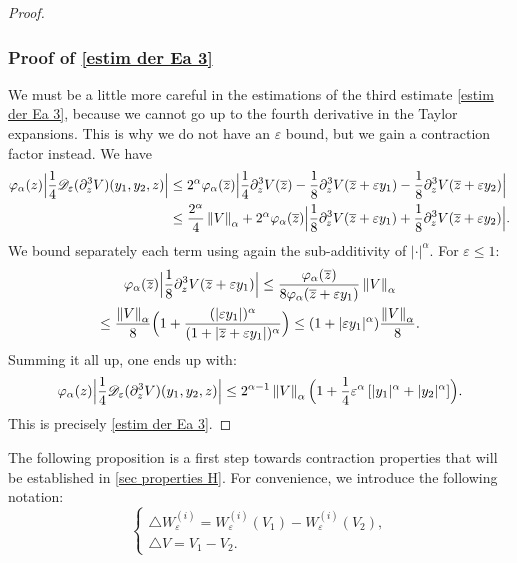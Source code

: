 \documentclass[10pt]{amsart}
\let\mathcal\mathscr
\theoremstyle{plain}
\theoremstyle{definition}
\newcommand{\D}{\mathcal{D}_\eps}
\let\eps\varepsilon
\newcommand{\abs}[1]{\left\lvert#1\right\rvert}
\newcommand{\nalph}[1]{\left\lVert#1\right\rVert_\alpha}
\newcommand{\bz}{\overline{z}}
\newcommand{\vphia}{\varphi_\alpha}
\begin{document}
\begin{proof}
\subsubsection*{Proof of \eqref{estim der Ea 3}}
We must be a little more careful in the estimations of the third estimate \eqref{estim der Ea 3}, because we cannot go up to the fourth derivative in the Taylor expansions. This is why we do not have an $\eps$ bound, but we gain a contraction factor instead. We have
\begin{align*}
\vphia(z) \Bigl| \dfrac{1}{4} \D(\partial_z^3 V)(y_1,y_2,z) \Bigr| & \leq 2^{\alpha} \vphia(\bz) \Bigl | \dfrac{1}{4} \partial_z^3 V(\bz) -\dfrac{1}{8} \partial^3_z V(\bz+\eps y_1)-\dfrac{1}{8} \partial^3_z V(\bz+\eps y_2) \Bigr| \\
& \leq \dfrac{2^{\alpha}}{4} \nalph{V} +2^{\alpha}\vphia(\bz) \Bigl | \dfrac{1}{8} \partial^3_z V(\bz+\eps y_1)+\dfrac{1}{8} \partial^3_z V(\bz+\eps y_2) \Bigr|.
\end{align*}
We bound separately each term using again the sub-additivity of $\abs{\cdot}^\alpha$. For $\eps \leq 1$:
\begin{multline*}
\vphia(\bz) \Bigl | \dfrac{1}{8} \partial^3_z V(\bz+\eps y_1) \Bigr | \leq \dfrac{\vphia(\bz)} { 8 \vphia(\bz+\eps y_1) } \nalph{V} \\
\leq \dfrac{\nalph{V}}{8} \Bigl(1 + \dfrac{(|\eps y_1 |)^\alpha}{(1+|\bz+\eps y_1|)^\alpha} \Bigr) \leq (1 + |\eps y_1|^\alpha)\dfrac{\nalph{V}}{8}.
\end{multline*}
Summing it all up, one ends up with:
\begin{equation*}
\vphia(z) \Bigl | \dfrac{1}{4} \D(\partial_z^3 V)(y_1,y_2,z) \Bigr| \leq 2^{\alpha-1} \nalph{V} \Bigl(1+ \frac14 \eps^\alpha \left[\vert y_1 \vert^{\alpha}+ \vert y_2 \vert^{\alpha} \right] \Bigr).
\end{equation*}
This is precisely \cref{estim der Ea 3}.
\end{proof}

The following proposition is a first step towards contraction properties that will be established in \cref{sec properties H}. For convenience, we introduce the following notation:
\begin{equation*}
\begin{cases}
\triangle W_\eps^{(i)} = W^{(i)}_\eps(V_1)-W^{(i)}_\eps(V_2), \\
\triangle V = V_1-V_2.
\end{cases}
\end{equation*}
\end{document}

